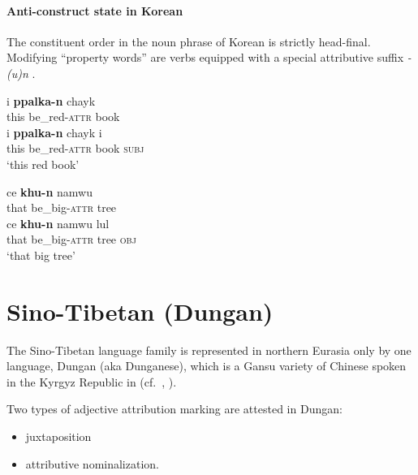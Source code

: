 \paragraph*{Anti\hyp{}construct state in Korean}
The constituent order in the noun phrase of Korean is strictly head-final. Modifying “property words” are verbs equipped with a special attributive suffix \textit{-(u)n} \citep{martin-etal1969}.
\begin{exe}
\begin{xlist}
\ex
\begin{xlist}
\ex
\gll	i \textbf{ppalka-n} chayk\\
	this be\_red-\textsc{attr} book\\
\ex	
\gll	i \textbf{ppalka-n} chayk i\\
	this be\_red-\textsc{attr} book \textsc{subj}\\
\glt	‘this red book’
\end{xlist}
\ex
\begin{xlist}
\ex	
\gll	ce \textbf{khu-n} namwu\\
	that be\_big-\textsc{attr} tree\\
\ex
\gll	ce \textbf{khu-n} namwu lul\\
	that be\_big-\textsc{attr} tree \textsc{obj}\\
\glt	‘that big tree’
\end{xlist}
\end{xlist}
\end{exe}

\section{Sino-Tibetan (Dungan)}
\label{sinotibetan synchr}
The Sino-Tibetan language family is represented in northern Eurasia only by one language, Dungan (aka Dunganese), which is a Gansu variety of Chinese spoken in the Kyrgyz Republic in  (cf.~\citealt[85]{yuo2003}, \citealt{kalimov1968}).

Two types of adjective attribution marking are attested in Dungan:
\begin{itemize}
\item juxtaposition
\item attributive nominalization.
\end{itemize}

